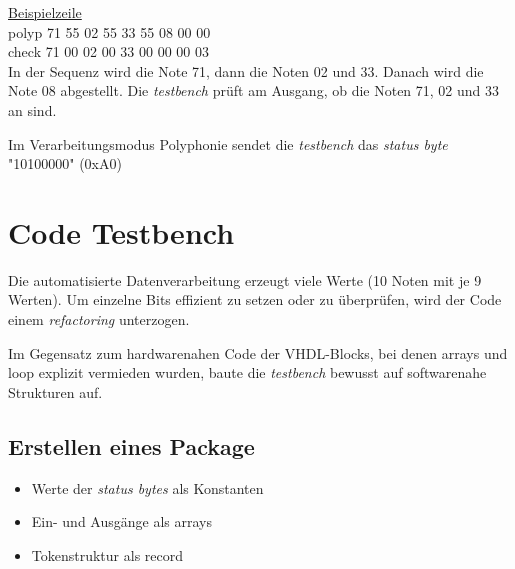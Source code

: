 \underline{Beispielzeile}\\
polyp \hspace*{2mm} 71 \hspace*{4mm} 55 \hspace*{12mm}  02 \hspace*{6mm} 55 \hspace*{10mm} 33 \hspace*{6mm} 55 \hspace*{10mm} 08 \hspace*{6mm} 00 \hspace*{12mm} 00\\
check \hspace*{2mm} 71 \hspace*{4mm} 00 \hspace*{12mm}  02 \hspace*{6mm} 00 \hspace*{10mm} 33 \hspace*{6mm} 00 \hspace*{10mm} 00 \hspace*{6mm} 00 \hspace*{12mm} 03\\

In der Sequenz wird die Note 71, dann die Noten 02 und 33. Danach wird die Note 08 abgestellt. Die \textit{testbench} prüft am Ausgang, ob die Noten 71, 02 und 33 an sind. 

Im Verarbeitungsmodus Polyphonie sendet die \textit{testbench}  das \textit{status byte} "10100000" (0xA0) 



\section{Code Testbench}\label{sec.code_testbench}
Die automatisierte Datenverarbeitung erzeugt viele Werte (10 Noten mit je 9 Werten). Um einzelne Bits effizient zu setzen oder zu überprüfen, wird der Code einem \textit{refactoring} unterzogen.

Im Gegensatz zum hardwarenahen Code der VHDL-Blocks, bei denen arrays und loop explizit vermieden wurden, baute die \textit{testbench} bewusst auf softwarenahe Strukturen auf.

\subsection{Erstellen eines Package}
\begin{itemize}
	\item Werte der \textit{status bytes} als Konstanten
	\item Ein- und Ausgänge als arrays
	\item Tokenstruktur als record
\end{itemize}
\smallskip


